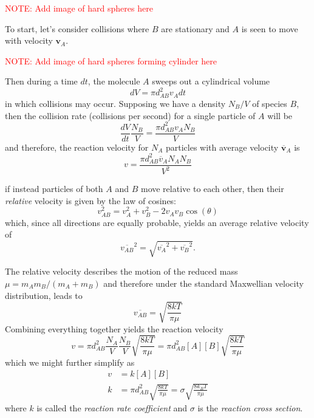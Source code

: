 \textcolor{red}{NOTE: Add image of hard spheres here}

To start, let's consider collisions where $B$ are stationary and $A$ is seen to move with velocity $\mathbf{v}_{A}$.

\textcolor{red}{NOTE: Add image of hard spheres forming cylinder here}

Then during a time $dt$, the molecule $A$ sweeps out a cylindrical volume
\begin{equation}
  dV = \pi d_{AB}^2 v_{A}dt
\end{equation}
in which collisions may occur. Supposing we have a density $N_{B}/V$ of species $B$, then the collision rate (collisions per second) for a single particle of $A$ will be
\begin{equation}
  \frac{dV}{dt}\frac{N_{B}}{V} = \frac{\pi d_{AB}^2 v_{A}N_{B}}{V}
\end{equation}
and therefore, the reaction velocity for $N_{A}$ particles with average velocity $\overline{\mathbf{v}}_{A}$ is
\begin{equation}
  v = \frac{\pi d_{AB}^2 \overline{v}_{A}N_AN_B}{V^2}
\end{equation}

if instead particles of both $A$ and $B$ move relative to each other, then their \textit{relative} velocity is given by the law of cosines:
\begin{equation}
  v_{AB}^2 = v_{A}^2 + v_{B}^2 - 2v_{A}v_{B}\cos(\theta)
\end{equation}
which, since all directions are equally probable, yields an average relative velocity of
\begin{equation}
  \overline{v_{AB}}^2 = \sqrt{\overline{v_{A}}^2 + \overline{v_{B}}^2}.
\end{equation}

The relative velocity describes the motion of the reduced mass $\mu=m_{A}m_{B}/(m_{A}+m_{B})$ and therefore under the standard Maxwellian velocity distribution, leads to
\begin{equation}
  \overline{v_{AB}} = \sqrt{\frac{8kT}{\pi \mu}}
\end{equation}
Combining everything together yields the reaction velocity
\begin{equation}
  v = \pi d_{AB}^2\frac{N_{A}}{V}\frac{N_{B}}{V}\sqrt{\frac{8kT}{\pi \mu}} = \pi d_{AB}^2[A][B]\sqrt{\frac{8kT}{\pi \mu}}
\end{equation}
which we might further simplify as
\begin{align}
  v &= k[A][B] \\
  k &= \pi d_{AB}^2\sqrt{\frac{8kT}{\pi \mu}} = \sigma \sqrt{\frac{8k_BT}{\pi \mu}}
\end{align}
where $k$ is called the \textit{reaction rate coefficient} and $\sigma$ is the \textit{reaction cross section}.


